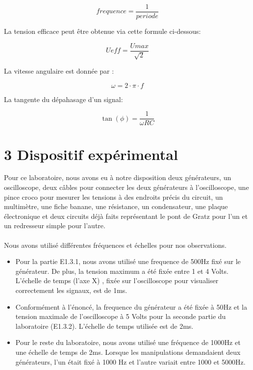 \documentclass{report}
\begin{document}
\begin{equation}
   frequence = \frac{1}{periode}
\end{equation}

La tension efficace peut \^etre obtenue via cette formule ci-dessous:

\begin{equation}
   Ueff = \frac{Umax}{\sqrt{2}}
\end{equation}

La vitesse angulaire est donn\'ee par :

\begin{equation}
    \omega = 2\cdot \pi \cdot f   
\end{equation}

La tangente du d\'epahasage d'un signal:

\begin{equation}
    \tan(\phi) = \frac{1}{\omega RC}
\end{equation}

\section*{3 Dispositif exp\'erimental}
\hspace*{0.5cm}
Pour ce laboratoire, nous avons eu \`a notre disposition deux g\'en\'erateurs, un oscilloscope, deux c\^ables pour connecter les deux g\'en\'erateurs \`a l'oscilloscope, une pince croco pour mesurer les tensions \`a des endroits pr\'ecis du circuit, un multim\`etre, une fiche banane, une r\'esistance, un condensateur, une plaque \'electronique et deux circuits d\'ej\`a faits repr\'esentant le pont de Gratz pour l'un et un redresseur simple pour l'autre.
\\
\\
Nous avons utilis\'e diff\'erentes fr\'equences et \'echelles pour nos observations.
\begin{itemize}

\item Pour la partie E1.3.1, nous avons utilis\'e une frequence de 500Hz fix\'e sur le g\'en\'erateur. De plus, la tension maximum a \'et\'e fix\'ee entre 1 et 4 Volts. L'\'echelle de temps (l'axe X) , fix\'ee sur l'oscilloscope pour visualiser correctement les signaux, est de 1ms.
\item Conform\'ement \`a l'\'enonc\'e, la frequence du g\'en\'erateur a \'et\'e fix\'ee \`a 50Hz et la tension maximale de l'oscilloscope \`a 5 Volts pour la seconde partie du laboratoire (E1.3.2). L'\'echelle de temps utilis\'ee est de 2ms.
\item Pour le reste du laboratoire, nous avons utilis\'e une fr\'equence de 1000Hz et une \'echelle de temps de 2ms. Lorsque les manipulations demandaient deux g\'en\'erateurs, l'un \'etait fix\'e \`a 1000 Hz et l'autre variait entre 1000 et 5000Hz.
\end{itemize} 
\end{document}
